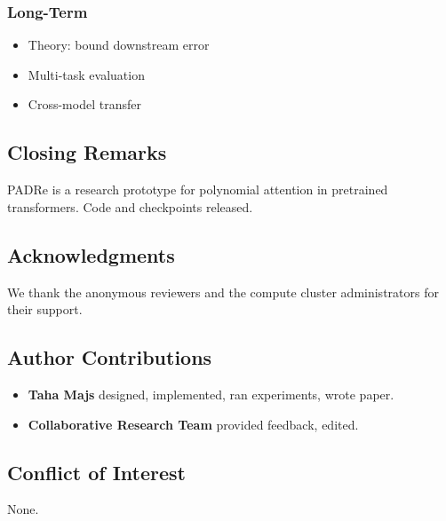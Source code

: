 \subsubsection{Long-Term}
\begin{itemize}
\item Theory: bound downstream error
\item Multi-task evaluation
\item Cross-model transfer

\end{itemize}
\subsection{Closing Remarks}

PADRe is a research prototype for polynomial attention in pretrained 
transformers. Code and checkpoints released.

\subsection{Acknowledgments}

We thank the anonymous reviewers and the compute cluster administrators for their support.

\subsection{Author Contributions}

\begin{itemize}
\item \textbf{Taha Majs} designed, implemented, ran experiments, wrote paper.
\item \textbf{Collaborative Research Team} provided feedback, edited.

\end{itemize}
\subsection{Conflict of Interest}

None.

